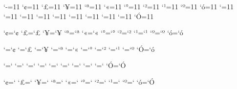 \bgroup

\catcode`-=11
\catcode`^^a2=11
\catcode`^^a3=11
\catcode`^^a5=11
\catcode`^^aa=11
\catcode`^^ab=11
\catcode`^^b0=11
\catcode`^^b2=11
\catcode`^^b9=11
\catcode`^^ba=11
\catcode`^^f3=11
\catcode`^^82=11
\catcode`^^83=11
\catcode`^^85=11
\catcode`^^8a=11
\catcode`^^8b=11
\catcode`^^90=11
\catcode`^^92=11
\catcode`^^99=11
\catcode`^^9a=11
\catcode`^^d3=11

\lccode`^^a2=`^^a2
\lccode`^^a3=`^^a3
\lccode`^^a5=`^^a5
\lccode`^^aa=`^^aa
\lccode`^^ab=`^^ab
\lccode`^^b0=`^^b0
\lccode`^^b2=`^^b2
\lccode`^^b9=`^^b9
\lccode`^^ba=`^^ba
\lccode`^^f3=`^^f3

\lccode`^^82=`^^a2
\lccode`^^83=`^^a3
\lccode`^^85=`^^a5
\lccode`^^8a=`^^aa
\lccode`^^8b=`^^ab
\lccode`^^90=`^^b0
\lccode`^^92=`^^b2
\lccode`^^99=`^^b9
\lccode`^^9a=`^^ba
\lccode`^^d3=`^^f3

\uccode`^^82=`^^82
\uccode`^^83=`^^83
\uccode`^^85=`^^85
\uccode`^^8a=`^^8a
\uccode`^^8b=`^^8b
\uccode`^^90=`^^90
\uccode`^^92=`^^92
\uccode`^^99=`^^99
\uccode`^^9a=`^^9a
\uccode`^^d3=`^^d3

\uccode`^^a2=`^^82
\uccode`^^a3=`^^83
\uccode`^^a5=`^^85
\uccode`^^aa=`^^8a
\uccode`^^ab=`^^8b
\uccode`^^b0=`^^90
\uccode`^^b2=`^^92
\uccode`^^b9=`^^99
\uccode`^^ba=`^^9a
\uccode`^^f3=`^^d3

